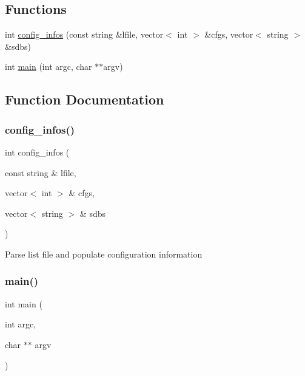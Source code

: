 \subsection*{Functions}
\begin{DoxyCompactItemize}
\item 
int \mbox{\hyperlink{adat-devel_2other__libs_2filedb_2src_2DBMergeTest_8cpp_af14f83ab136ba660d61a843c52e620e7}{config\+\_\+infos}} (const string \&lfile, vector$<$ int $>$ \&cfgs, vector$<$ string $>$ \&sdbs)
\item 
int \mbox{\hyperlink{adat-devel_2other__libs_2filedb_2src_2DBMergeTest_8cpp_a3c04138a5bfe5d72780bb7e82a18e627}{main}} (int argc, char $\ast$$\ast$argv)
\end{DoxyCompactItemize}


\subsection{Function Documentation}
\mbox{\label{adat-devel_2other__libs_2filedb_2src_2DBMergeTest_8cpp_af14f83ab136ba660d61a843c52e620e7}} 
\subsubsection{\texorpdfstring{config\_infos()}{config\_infos()}}
{\footnotesize\ttfamily int config\+\_\+infos (\begin{DoxyParamCaption}\item[{const string \&}]{lfile,  }\item[{vector$<$ int $>$ \&}]{cfgs,  }\item[{vector$<$ string $>$ \&}]{sdbs }\end{DoxyParamCaption})}

Parse list file and populate configuration information \mbox{\label{adat-devel_2other__libs_2filedb_2src_2DBMergeTest_8cpp_a3c04138a5bfe5d72780bb7e82a18e627}} 
\subsubsection{\texorpdfstring{main()}{main()}}
{\footnotesize\ttfamily int main (\begin{DoxyParamCaption}\item[{int}]{argc,  }\item[{char $\ast$$\ast$}]{argv }\end{DoxyParamCaption})}

